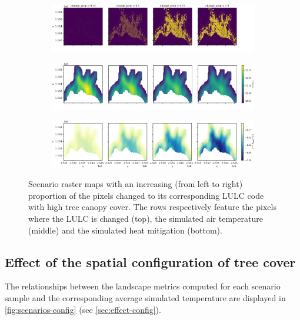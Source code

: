 \documentclass[12pt]{iopart}
\begin{document}
\begin{figure}
  \begin{subfigure}{\textwidth}
    \centering
    \includegraphics[width=\textwidth]{figures/scenarios-prop-lulc.png}
  \end{subfigure}
  \begin{subfigure}{\textwidth}
    \centering    
    \includegraphics[width=\textwidth]{figures/scenarios-prop-T.png}  
  \end{subfigure}
  \begin{subfigure}{\textwidth}
    \centering    
    \includegraphics[width=\textwidth]{figures/scenarios-prop-mitigation.png}
  \end{subfigure}
  \caption{\label{fig:scenarios-prop} Scenario raster maps with an increasing (from left to right) proportion of the pixels changed to its corresponding LULC code with high tree canopy cover. The rows respectively feature the pixels where the LULC is changed (top), the simulated air temperature (middle) and the simulated heat mitigation (bottom).}
\end{figure}





\subsection{Effect of the spatial configuration of tree cover}

The relationships between the landscape metrics computed for each scenario sample and the corresponding average simulated temperature are displayed in \autoref{fig:scenarios-config} (see \ref{sec:effect-config}).
\end{document}
